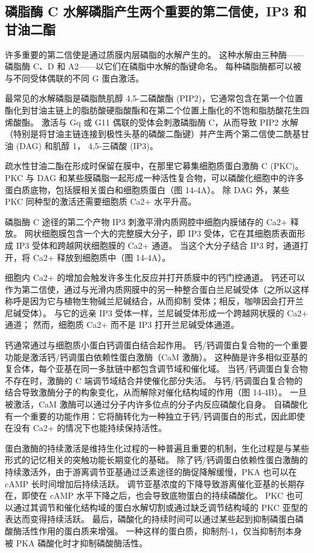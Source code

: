 \subsection{磷脂酶 C 水解磷脂产生两个重要的第二信使，IP3 和甘油二酯}

许多重要的第二信使是通过质膜内层磷脂的水解产生的。 这种水解由三种酶——磷脂酶 C、D 和 A2——以它们在磷脂中水解的酯键命名。 每种磷脂酶都可以被与不同受体偶联的不同 G 蛋白激活。

最常见的水解磷脂是磷脂酰肌醇 4,5-二磷酸酯 (PIP2)，它通常包含在第一个位置酯化到甘油主链上的脂肪酸硬脂酸酯和在第二个位置上酯化的不饱和脂肪酸花生四烯酸酯。 激活与 Gq 或 G11 偶联的受体会刺激磷脂酶 C，从而导致 PIP2 水解（特别是将甘油主链连接到极性头基的磷酸二酯键）并产生两个第二信使二酰基甘油 (DAG) 和肌醇 1， 4,5-三磷酸 (IP3)。

疏水性甘油二酯在形成时保留在膜中，在那里它募集细胞质蛋白激酶 C (PKC)。 PKC 与 DAG 和某些膜磷脂一起形成一种活性复合物，可以磷酸化细胞中的许多蛋白质底物，包括膜相关蛋白和细胞质蛋白（图 14-4A）。 除 DAG 外，某些 PKC 同种型的激活还需要细胞质 Ca2+ 水平升高。

磷脂酶 C 途径的第二个产物 IP3 刺激平滑内质网腔中细胞内膜储存的 Ca2+ 释放。 网状细胞膜包含一个大的完整膜大分子，即 IP3 受体，它在其细胞质表面形成 IP3 受体和跨越网状细胞膜的 Ca2+ 通道。 当这个大分子结合 IP3 时，通道打开，将 Ca2+ 释放到细胞质中（图 14-4A）。

细胞内 Ca2+ 的增加会触发许多生化反应并打开质膜中的钙门控通道。 钙还可以作为第二信使，通过与光滑内质网膜中的另一种整合蛋白兰尼碱受体（之所以这样称呼是因为它与植物生物碱兰尼碱结合，从而抑制 受体；相反，咖啡因会打开兰尼碱受体）。 与它的远亲 IP3 受体一样，兰尼碱受体形成一个跨越网状膜的 Ca2+ 通道； 然而，细胞质 Ca2+ 而不是 IP3 打开兰尼碱受体通道。

钙通常通过与细胞质小蛋白钙调蛋白结合起作用。 钙/钙调蛋白复合物的一个重要功能是激活钙/钙调蛋白依赖性蛋白激酶（CaM 激酶）。 这种酶是许多相似亚基的复合体，每个亚基在同一多肽链中都包含调节域和催化域。 当钙/钙调蛋白复合物不存在时，激酶的 C 端调节域结合并使催化部分失活。 与钙/钙调蛋白复合物的结合导致激酶分子的构象变化，从而解除对催化结构域的作用（图 14-4B）。 一旦被激活，CaM 激酶可以通过分子内许多位点的分子内反应磷酸化自身。 自磷酸化有一个重要的功能作用：它将酶转化为一种独立于钙/钙调蛋白的形式，因此即使在没有 Ca2+ 的情况下也能持续保持活性。

蛋白激酶的持续激活是维持生化过程的一种普遍且重要的机制，生化过程是与某些形式的记忆相关的突触功能长期变化的基础。 除了钙/钙调蛋白依赖性蛋白激酶的持续激活外，由于游离调节亚基通过泛素途径的酶促降解缓慢，PKA 也可以在 cAMP 长时间增加后持续活跃。 调节亚基浓度的下降导致游离催化亚基的长期存在，即使在 cAMP 水平下降之后，也会导致底物蛋白的持续磷酸化。 PKC 也可以通过其调节和催化结构域的蛋白水解切割或通过缺乏调节结构域的 PKC 亚型的表达而变得持续活跃。 最后，磷酸化的持续时间可以通过某些起到抑制磷蛋白磷酸酶活性作用的蛋白质来增强。 一种这样的蛋白质，抑制剂-1，仅当抑制剂本身被 PKA 磷酸化时才抑制磷酸酶活性。

